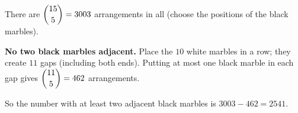 There are $\dbinom{15}{5}=3003$ arrangements in all (choose the positions of the black marbles).

\textbf{No two black marbles adjacent.} Place the $10$ white marbles in a row; they create $11$ gaps (including both ends). Putting at most one black marble in each gap gives $\dbinom{11}{5}=462$ arrangements.

So the number with at least two adjacent black marbles is $3003-462=\boxed{2541}$.
